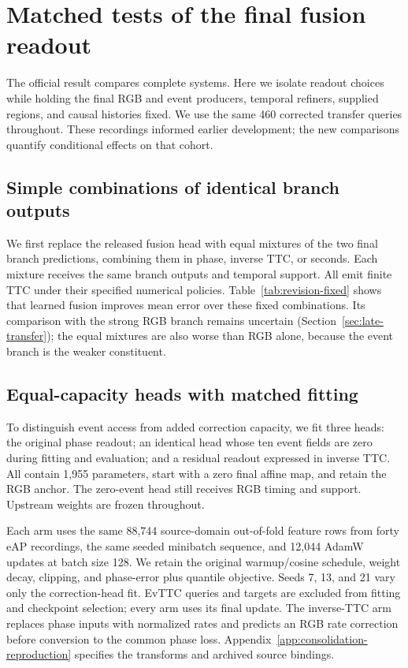 \section{Matched tests of the final fusion readout}
\label{sec:design-analysis}
The official result compares complete systems. Here we isolate readout choices while holding the final RGB and event producers, temporal refiners, supplied regions, and causal histories fixed. We use the same 460 corrected transfer queries throughout. These recordings informed earlier development; the new comparisons quantify conditional effects on that cohort.

\subsection{Simple combinations of identical branch outputs}
We first replace the released fusion head with equal mixtures of the two final branch predictions, combining them in phase, inverse TTC, or seconds. Each mixture receives the same branch outputs and temporal support. All emit finite TTC under their specified numerical policies. Table~\ref{tab:revision-fixed} shows that learned fusion improves mean error over these fixed combinations. Its comparison with the strong RGB branch remains uncertain (Section~\ref{sec:late-transfer}); the equal mixtures are also worse than RGB alone, because the event branch is the weaker constituent.
\begin{table}[htbp]
\centering\small
\caption{Frozen final-branch readouts on the identical 460 queries. Equal mixtures have no fitted parameters; the released head has 1,955. This comparison holds upstream information fixed but does not match readout capacity.}
\label{tab:revision-fixed}
\end{table}

\subsection{Equal-capacity heads with matched fitting}
To distinguish event access from added correction capacity, we fit three heads: the original phase readout; an identical head whose ten event fields are zero during fitting and evaluation; and a residual readout expressed in inverse TTC. All contain 1,955 parameters, start with a zero final affine map, and retain the RGB anchor. The zero-event head still receives RGB timing and support. Upstream weights are frozen throughout.

Each arm uses the same 88,744 source-domain out-of-fold feature rows from forty eAP recordings, the same seeded minibatch sequence, and 12,044 AdamW \citep{loshchilov2019} updates at batch size 128. We retain the original warmup/cosine schedule, weight decay, clipping, and phase-error plus quantile objective. Seeds 7, 13, and 21 vary only the correction-head fit. EvTTC queries and targets are excluded from fitting and checkpoint selection; every arm uses its final update. The inverse-TTC arm replaces phase inputs with normalized rates and predicts an RGB rate correction before conversion to the common phase loss. Appendix~\ref{app:consolidation-reproduction} specifies the transforms and archived source bindings.

